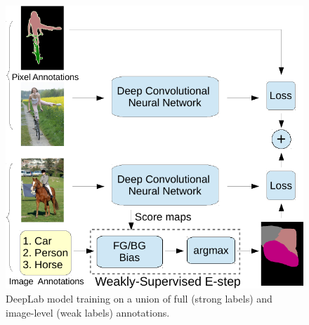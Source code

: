 \begin{figure}[tbp!]
  \centering
  \includegraphics[width=0.8\linewidth]{fig/model_train_twoEnd.pdf} 
  \caption{DeepLab model training on a union of full (strong labels) 
    and image-level (weak labels) annotations.}
  \label{fig:model_illustrations_twoEnd}
  \vspace{-0.5cm}
\end{figure}


